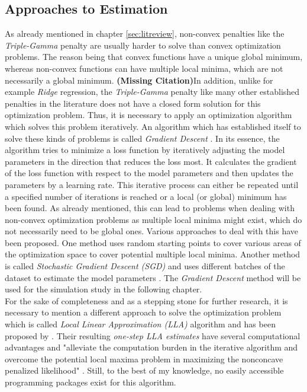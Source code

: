 \documentclass[12pt,a4paper]{article}
\newcommand{\MC}{\textbf{(Missing Citation)}} %
\begin{document}
\subsection{Approaches to Estimation}
As already mentioned in chapter \ref{sec:litreview}, non-convex penalties like the \textit{Triple-Gamma} penalty are usually harder to solve than convex optimization problems. The reason being that convex functions have a unique global minimum, whereas non-convex functions can have multiple local minima, which are not necessarily a global minimum. \MC In addition, unlike for example \textit{Ridge} regression, the \textit{Triple-Gamma} penalty like many other established penalties in the literature does not have a closed form solution for this optimization problem. Thus, it is necessary to apply an optimization algorithm which solves this problem iteratively. An algorithm which has established itself to solve these kinds of problems is called \textit{Gradient Descent} \parencite[229--248]{GrippoSciandrone2023}. In its essence, the algorithm tries to minimize a loss function by iteratively adjusting the model parameters in the direction that reduces the loss most. It calculates the gradient of the loss function with respect to the model parameters and then updates the parameters by a learning rate. This iterative process can either be repeated until a specified number of iterations is reached or a local (or global) minimum has been found. As already mentioned, this can lead to problems when dealing with non-convex optimization problems as multiple local minima might exist, which do not necessarily need to be global ones. Various approaches to deal with this have been proposed. One method uses random starting points to cover various areas of the optimization space to cover potential multiple local minima. Another method is called \textit{Stochastic Gradient Descent (SGD)} and uses different batches of the dataset to estimate the model parameters \parencite{Amari1993}. The \textit{Gradient Descent} method will be used for the simulation study in the following chapter.\\

For the sake of completeness and as a stepping stone for further research, it is necessary to mention a different approach to solve the optimization problem which is called \textit{Local Linear Approximation (LLA)} algorithm and has been proposed by \textcite{ZouLi2008}. Their resulting \textit{one-step LLA estimates} have several computational advantages and "alleviate the computation burden in the iterative algorithm and overcome the potential local maxima problem in maximizing the nonconcave penalized likelihood" \parencite{ZouLi2008}. Still, to the best of my knowledge, no easily accessible programming packages exist for this algorithm.
\end{document}
